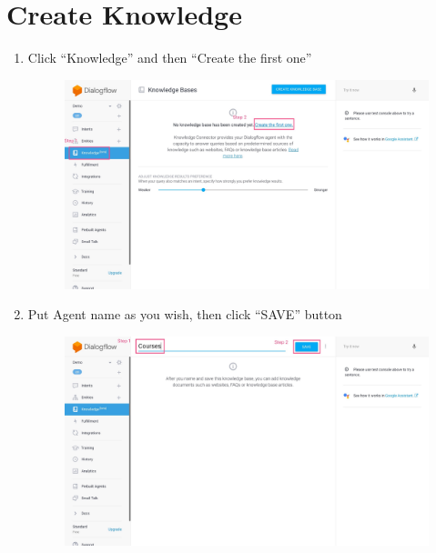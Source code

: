 \section{Create Knowledge} %
\label{sec:create_knowledge}
\begin{enumerate}

	\item Click “Knowledge” and then “Create the first one”

	\begin{figure}[H]
		\centering
		\includegraphics[width=\linewidth, frame]{img/manual_7.jpg}
	\end{figure}

	\item Put Agent name as you wish, then click “SAVE” button

	\begin{figure}[H]
		\centering
		\includegraphics[width=\linewidth, frame]{img/manual_8.jpg}
	\end{figure}


\end{enumerate}
